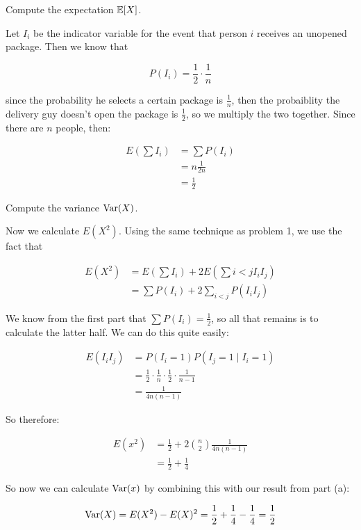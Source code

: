 \documentclass[11pt]{article}
\begin{document}
\begin{Parts}

\Part Compute the expectation $\operatorname{\mathbb{E}}[X]$.

\begin{solution}
    Let $I_i$ be the indicator variable for the event that person $i$ receives an unopened package. Then we know that 

    \[ P(I_i) = \frac{1}{2} \cdot \frac{1}{n}\] 

    since the probability he selects a certain package is $\frac{1}{n}$, then the probaiblity the delivery guy doesn't open the package is $\frac{1}{2}$, so we multiply the two together. Since there are $n$ people, then: 

    \begin{align*}
        E(\sum I_i) &= \sum P(I_i)\\
        &= n \frac{1}{2n}\\
        &= \frac{1}{2}
    \end{align*}
\end{solution}

\Part Compute the variance $\operatorname{Var}(X)$.

\begin{solution}
    Now we calculate $E(X^2)$. Using the same technique as problem 1, we use the fact that 

    \begin{align*}
        E(X^2) &= E(\sum I_i) + 2 E(\sum{i < j} I_i I_j)\\
        &= \sum P(I_i) + 2 \sum_{i < j} P(I_i I_j)
    \end{align*}

    We know from the first part that $\sum P(I_i) = \frac{1}{2}$, so all that remains is to calculate the latter half. We can do this quite easily: 

    \begin{align*}
        E(I_iI_j) &= P(I_i = 1)P(I_j = 1 \mid I_i = 1)\\
        &= \frac{1}{2} \cdot \frac{1}{n} \cdot \frac{1}{2} \cdot \frac{1}{n-1}\\
        &= \frac{1}{4n(n-1)}
    \end{align*}

    So therefore: 

    \begin{align*}
        E(x^2) &= \frac{1}{2} + 2 {n \choose 2} \frac{1}{4n(n-1)}\\
        &= \frac{1}{2} + \frac 14
    \end{align*}

    So now we can calculate $\operatorname{Var}(x)$ by combining this with our result from part (a): 

    \[ \operatorname{Var}(X) = E(X^2) - E(X)^2 = \frac 12 + \frac 14 - \frac 14 = \frac 12\] 
\end{solution}
\end{Parts}
\pagebreak
{}
\end{document}
